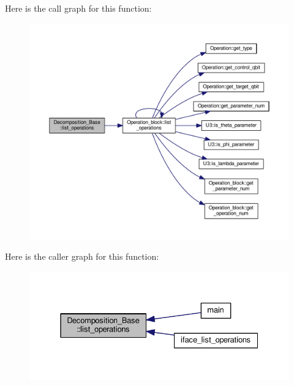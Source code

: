 Here is the call graph for this function\+:
\nopagebreak
\begin{figure}[H]
\begin{center}
\leavevmode
\includegraphics[width=350pt]{class_decomposition___base_a4c6c81d70f49ee249aa455a4f2718ee2_cgraph}
\end{center}
\end{figure}




Here is the caller graph for this function\+:
\nopagebreak
\begin{figure}[H]
\begin{center}
\leavevmode
\includegraphics[width=331pt]{class_decomposition___base_a4c6c81d70f49ee249aa455a4f2718ee2_icgraph}
\end{center}
\end{figure}



